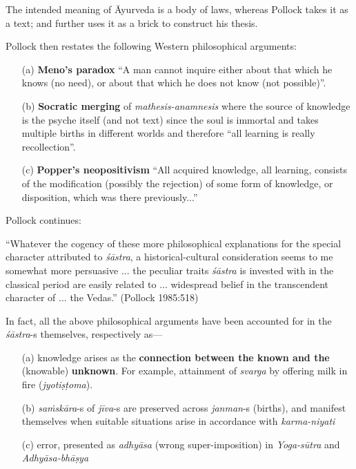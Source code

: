 The intended meaning of Āyurveda is a body of laws, whereas Pollock takes it as a text; and further uses it as a brick to construct his thesis. 

Pollock then restates the following Western philosophical arguments:
\begin{itemize}
\itemsep=1pt
\item[(a)] {\bf Meno's paradox}  ``A man cannot inquire either about that which he knows (no need), or about that which he does not know (not possible)''.

\item[(b)] {\bf Socratic merging} of {\sl mathesis-anamnesis} where the source of knowledge is the psyche itself (and not text) since the soul is immortal and takes multiple births in different worlds and therefore ``all learning is really recollection''.

\item[(c)] {\bf Popper's neopositivism} ``All acquired knowledge, all learning, consists of the modiﬁcation (possibly the rejection) of some form of knowledge, or disposition, which was there previously...''
\end{itemize}
Pollock continues:
\begin{myquote}
``Whatever the cogency of these more philosophical explanations for the special character attributed to {\sl śāstra}, a historical-cultural consideration seems to me somewhat more persuasive ... the peculiar traits {\sl śāstra} is invested with in the classical period are easily related to ... widespread belief in the transcendent character of ... the Vedas.'' (Pollock 1985:518)
\end{myquote}

In fact, all the above philosophical arguments have been accounted for in the {\sl śāstra}-s themselves, respectively as---
\begin{itemize}
\itemsep=1pt
\item[(a)] knowledge arises as the {\bf connection between the known and the } (knowable) {\bf unknown}. For example, attainment of {\sl svarga} by offering milk in ﬁre ({\sl jyotiṣṭoma}).

\item[(b)] {\sl saṁskāra}-s of {\sl jīva}-s are preserved across {\sl janman}-s (births), and manifest themselves when suitable situations arise in accordance with {\sl karma-niyati}

\item[(c)] error, presented as {\sl adhyāsa} (wrong super-imposition) in {\sl Yoga-\break sūtra} and {\sl Adhyāsa-bhāṣya}
\end{itemize}

